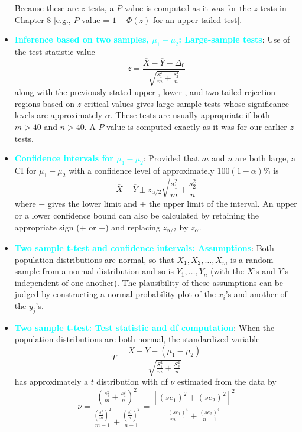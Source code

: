 \documentclass{report}
\begin{document}
\begin{itemize}
\begin{tabbing}
        \end{tabbing}
        Because these are $z$ tests, a $P$-value is computed as it was for the $z$ tests in Chapter 8 [e.g., $P$-value = $1 - \Phi(z)$ for an upper-tailed test].
        \item \textbf{\textcolor{cyan}{Inference based on two samples, $\mu_{1} - \mu_{2}$: Large-sample tests}}:
        Use of the test statistic value
        \[
            z = \frac{\overline{X} - \overline{Y} - \Delta_0}{\sqrt{\frac{s_1^2}{m} + \frac{s_2^2}{n}}}
        \]
        along with the previously stated upper-, lower-, and two-tailed rejection regions based on $z$ critical values gives large-sample tests whose significance levels are approximately $\alpha$. These tests are usually appropriate if both $m > 40$ and $n > 40$. A $P$-value is computed exactly as it was for our earlier $z$ tests.
        \item \textbf{\textcolor{cyan}{Confidence intervals for $\mu_{1} - \mu_{2}$}}:
        Provided that $m$ and $n$ are both large, a CI for $\mu_1 - \mu_2$ with a confidence level of approximately $100(1 - \alpha)\%$ is
        \[
            \overline{X} - \overline{Y} \pm z_{\alpha/2} \sqrt{\frac{s_1^2}{m} + \frac{s_2^2}{n}}
        \]
        where $-$ gives the lower limit and $+$ the upper limit of the interval. An upper or a lower confidence bound can also be calculated by retaining the appropriate sign ($+$ or $-$) and replacing $z_{\alpha/2}$ by $z_{\alpha}$.
    \item \textbf{\textcolor{cyan}{Two sample t-test and confidence intervals: Assumptions}}:
        Both population distributions are normal, so that $X_1, X_2, \ldots, X_m$ is a random sample from a normal distribution and so is $Y_1, \ldots, Y_n$ (with the $X$'s and $Y$'s independent of one another). The plausibility of these assumptions can be judged by constructing a normal probability plot of the $x_i$'s and another of the $y_j$'s.
    \item \textbf{\textcolor{cyan}{Two sample t-test: Test statistic and df computation}}:
        When the population distributions are both normal, the standardized variable
        \[
            T = \frac{\overline{X} - \overline{Y} - (\mu_1 - \mu_2)}{\sqrt{\frac{S_1^2}{m} + \frac{S_2^2}{n}}}
        \]
        has approximately a $t$ distribution with df $\nu$ estimated from the data by
        \[
            \nu = \frac{\left( \frac{s_1^2}{m} + \frac{s_2^2}{n} \right)^2}{\frac{\left( \frac{s_1^2}{m} \right)^2}{m - 1} + \frac{\left( \frac{s_2^2}{n} \right)^2}{n - 1}} = \frac{[(se_1)^2 + (se_2)^2]^2}{\frac{(se_1)^4}{m - 1} + \frac{(se_2)^4}{n - 1}}
\]
\end{itemize}
\end{document}
